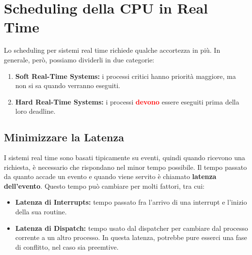 \section{Scheduling della CPU in Real Time}
Lo scheduling per sistemi real time richiede qualche accortezza in più. In generale, però, possiamo dividerli in due categorie:
\begin{enumerate}
  \item \textbf{Soft Real-Time Systems:} i processi critici hanno priorità maggiore, ma non si sa quando verranno eseguiti.
  \item \textbf{Hard Real-Time Systems:} i processi \textcolor{red}{\textbf{devono}} essere eseguiti prima della loro deadline.
\end{enumerate}

\subsection{Minimizzare la Latenza}
I sistemi real time sono basati tipicamente su eventi, quindi quando ricevono una richiesta, è necessario che rispondano nel minor tempo possibile.
Il tempo passato da quanto accade un evento e quando viene servito è chiamato \textbf{latenza dell'evento}. Questo tempo può cambiare per molti fattori, tra cui:
\begin{itemize}
  \item \textbf{Latenza di Interrupts:} tempo passato fra l'arrivo di una interrupt e l'inizio della sua routine.
  \item \textbf{Latenza di Dispatch:} tempo usato dal dispatcher per cambiare dal processo corrente a un altro processo. 
    In questa latenza, potrebbe pure esserci una fase di conflitto, nel caso sia preemtive.
\end{itemize}

